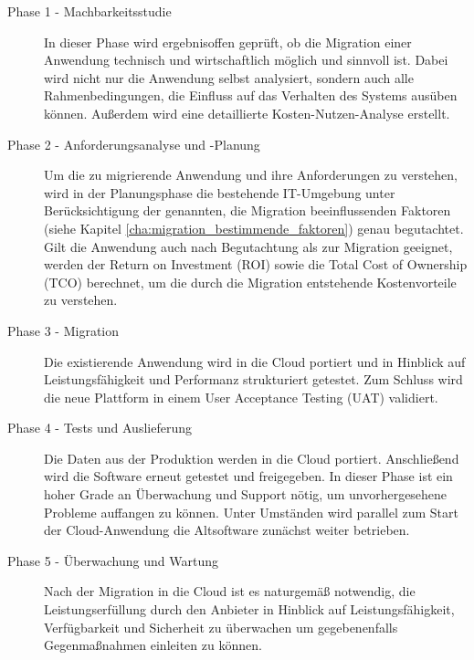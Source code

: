 \begin{description}
	\item[Phase 1 - Machbarkeitsstudie] In dieser Phase wird ergebnisoffen 
geprüft, ob die Migration einer Anwendung technisch und wirtschaftlich möglich 
und sinnvoll ist. Dabei wird nicht nur die Anwendung selbst analysiert, sondern 
auch alle Rahmenbedingungen, die Einfluss auf das Verhalten des Systems ausüben 
können. Außerdem wird eine detaillierte Kosten-Nutzen-Analyse erstellt.	

	\item[Phase 2 - Anforderungsanalyse und -Planung] Um die zu migrierende 
Anwendung und ihre Anforderungen zu verstehen, wird in der Planungsphase die 
bestehende IT-Umgebung unter Berücksichtigung der genannten, die Migration 
beeinflussenden Faktoren (siehe  Kapitel 
\ref{cha:migration_bestimmende_faktoren}) 
genau begutachtet. Gilt die Anwendung auch nach Begutachtung als zur Migration 
geeignet, werden der Return on Investment (ROI) sowie die Total Cost of 
Ownership (TCO) berechnet, um die durch die Migration entstehende 
Kostenvorteile 
zu verstehen.
	
	\item[Phase 3 - Migration] Die existierende Anwendung wird in die Cloud 
portiert und in Hinblick auf Leistungsfähigkeit und Performanz strukturiert 
getestet. Zum Schluss wird die neue Plattform in einem User Acceptance Testing 
(UAT) validiert. 
	
	\item[Phase 4 - Tests und Auslieferung] Die Daten aus der Produktion 
werden in die Cloud portiert. Anschließend wird die Software erneut getestet 
und freigegeben. In dieser Phase ist ein hoher Grade an Überwachung und Support 
nötig, um unvorhergesehene Probleme auffangen zu können. Unter Umständen wird 
parallel zum Start der Cloud-Anwendung die Altsoftware zunächst weiter 
betrieben.

	\item[Phase 5 - Überwachung und Wartung] Nach der Migration in die 
Cloud ist es naturgemäß notwendig, die Leistungserfüllung durch den Anbieter in 
Hinblick auf Leistungsfähigkeit, Verfügbarkeit und Sicherheit zu überwachen um 
gegebenenfalls Gegenmaßnahmen einleiten zu können.
\end{description}




